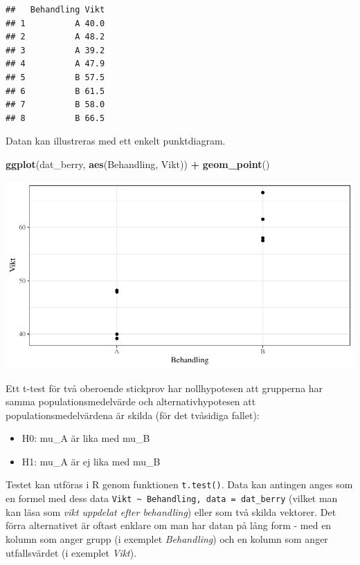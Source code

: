 \documentclass[
]{book}
\newenvironment{Shaded}{\begin{snugshade}}{\end{snugshade}}
\newcommand{\FunctionTok}[1]{\textcolor[rgb]{0.13,0.29,0.53}{\textbf{#1}}}
\newcommand{\NormalTok}[1]{#1}
\newcommand{\SpecialCharTok}[1]{\textcolor[rgb]{0.81,0.36,0.00}{\textbf{#1}}}
\providecommand{\tightlist}{%
  \setlength{\itemsep}{0pt}\setlength{\parskip}{0pt}}
\theoremstyle{definition}
\theoremstyle{definition}
\theoremstyle{definition}
\theoremstyle{definition}
\theoremstyle{remark}
\begin{document}
\begin{verbatim}
##   Behandling Vikt
## 1          A 40.0
## 2          A 48.2
## 3          A 39.2
## 4          A 47.9
## 5          B 57.5
## 6          B 61.5
## 7          B 58.0
## 8          B 66.5
\end{verbatim}

Datan kan illustreras med ett enkelt punktdiagram.

\begin{Shaded}
\begin{Highlighting}[]
\FunctionTok{ggplot}\NormalTok{(dat\_berry, }\FunctionTok{aes}\NormalTok{(Behandling, Vikt)) }\SpecialCharTok{+}
  \FunctionTok{geom\_point}\NormalTok{()}
\end{Highlighting}
\end{Shaded}

\begin{center}\includegraphics{R-anvisningar_files/figure-latex/unnamed-chunk-161-1} \end{center}

Ett t-test för två oberoende stickprov har nollhypotesen att grupperna har samma populationsmedelvärde och alternativhypotesen att populationsmedelvärdena är skilda (för det tvåsidiga fallet):

\begin{itemize}
\tightlist
\item
  H0: mu\_A är lika med mu\_B
\item
  H1: mu\_A är ej lika med mu\_B
\end{itemize}

Testet kan utföras i R genom funktionen \texttt{t.test()}. Data kan antingen anges som en formel med dess data \texttt{Vikt\ \textasciitilde{}\ Behandling,\ data\ =\ dat\_berry} (vilket man kan läsa som \emph{vikt uppdelat efter behandling}) eller som två skilda vektorer. Det förra alternativet är oftast enklare om man har datan på lång form - med en kolumn som anger grupp (i exemplet \emph{Behandling}) och en kolumn som anger utfallsvärdet (i exemplet \emph{Vikt}).
\end{document}
